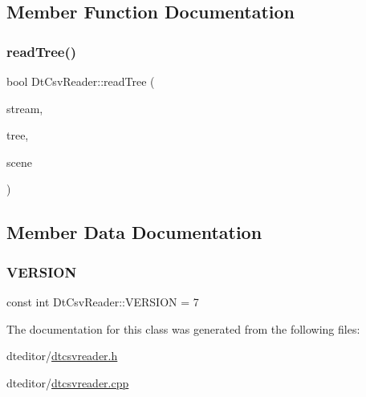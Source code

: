 \subsection{Member Function Documentation}
\mbox{\label{class_dt_csv_reader_a4588366de4199026256c0529a064c954}} 
\subsubsection{\texorpdfstring{readTree()}{readTree()}}
{\footnotesize\ttfamily bool Dt\+Csv\+Reader\+::read\+Tree (\begin{DoxyParamCaption}\item[{Q\+Text\+Stream \&}]{stream,  }\item[{std\+::shared\+\_\+ptr$<$ \mbox{\hyperlink{classdtree_1_1_decision_tree}{dtree\+::\+Decision\+Tree}} $>$}]{tree,  }\item[{\mbox{\hyperlink{class_dt_graphics_scene}{Dt\+Graphics\+Scene}} $\ast$}]{scene }\end{DoxyParamCaption})}



\subsection{Member Data Documentation}
\mbox{\label{class_dt_csv_reader_a18249e168ab97de92944a067254a3eec}} 
\subsubsection{\texorpdfstring{VERSION}{VERSION}}
{\footnotesize\ttfamily const int Dt\+Csv\+Reader\+::\+V\+E\+R\+S\+I\+ON = 7\hspace{0.3cm}{\ttfamily [static]}}



The documentation for this class was generated from the following files\+:\begin{DoxyCompactItemize}
\item 
dteditor/\mbox{\hyperlink{dtcsvreader_8h}{dtcsvreader.\+h}}\item 
dteditor/\mbox{\hyperlink{dtcsvreader_8cpp}{dtcsvreader.\+cpp}}\end{DoxyCompactItemize}
